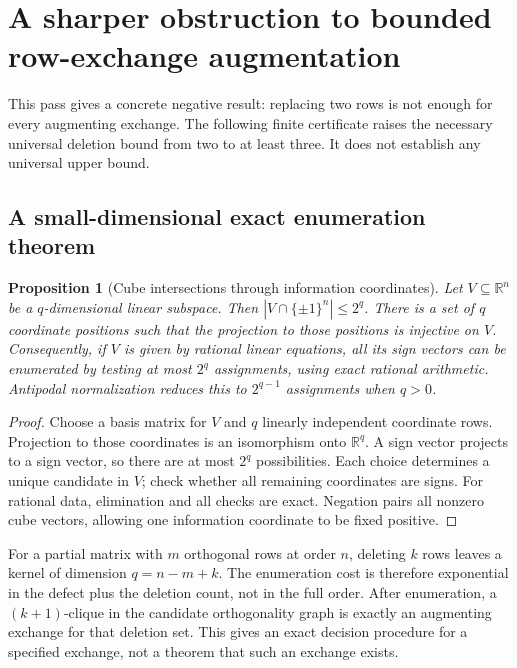 \documentclass[11pt]{article}
\newtheorem{proposition}{Proposition}[section]
\begin{document}
\section{A sharper obstruction to bounded row-exchange augmentation}

This pass gives a concrete negative result: replacing two rows is not
enough for every augmenting exchange. The following finite certificate
raises the necessary universal deletion bound from two to at least three.
It does not establish any universal upper bound.

\subsection{A small-dimensional exact enumeration theorem}
\begin{proposition}[Cube intersections through information coordinates]
Let $V\subseteq\mathbb R^n$ be a $q$-dimensional linear subspace. Then
$|V\cap\{\pm1\}^n|\le2^q$. There is a set of $q$ coordinate positions
such that the projection to those positions is injective on $V$.
Consequently, if $V$ is given by rational linear equations, all its
sign vectors can be enumerated by testing at most $2^q$ assignments,
using exact rational arithmetic. Antipodal normalization reduces this
to $2^{q-1}$ assignments when $q>0$.
\end{proposition}
\begin{proof}
Choose a basis matrix for $V$ and $q$ linearly independent coordinate
rows. Projection to those coordinates is an isomorphism onto
$\mathbb R^q$. A sign vector projects to a sign vector, so there are
at most $2^q$ possibilities. Each choice determines a unique candidate
in $V$; check whether all remaining coordinates are signs. For rational
data, elimination and all checks are exact. Negation pairs all nonzero
cube vectors, allowing one information coordinate to be fixed positive.
\end{proof}

For a partial matrix with $m$ orthogonal rows at order $n$, deleting $k$
rows leaves a kernel of dimension $q=n-m+k$. The enumeration cost is
therefore exponential in the defect plus the deletion count, not in
the full order. After enumeration, a $(k+1)$-clique in the candidate
orthogonality graph is exactly an augmenting exchange for that deletion
set. This gives an exact decision procedure for a specified exchange,
not a theorem that such an exchange exists.
\end{document}
